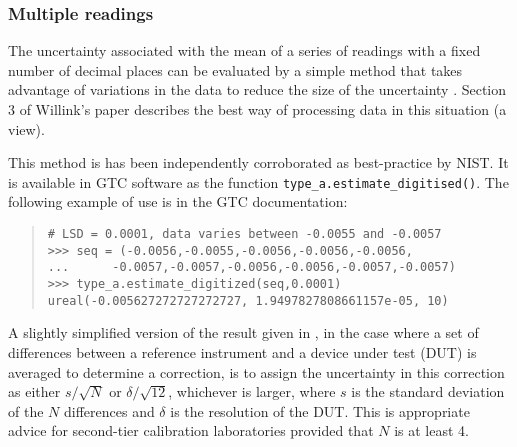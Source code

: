 \subsubsection{Multiple readings}
The uncertainty associated with the mean of a series of readings with a fixed number of decimal places can be evaluated by a simple method that takes advantage of variations in the data to reduce the size of the uncertainty \cite{WILLINK_07}. Section 3 of Willink's paper describes the best way of processing data in this situation (a view).
 
This method is has been independently corroborated as best-practice by NIST.  It is available in GTC software as the function \verb|type_a.estimate_digitised()|.   The following example of use is in the GTC documentation:
\begin{quote}
\begin{verbatim}
# LSD = 0.0001, data varies between -0.0055 and -0.0057
>>> seq = (-0.0056,-0.0055,-0.0056,-0.0056,-0.0056, 
...      -0.0057,-0.0057,-0.0056,-0.0056,-0.0057,-0.0057)
>>> type_a.estimate_digitized(seq,0.0001)
ureal(-0.005627272727272727, 1.9497827808661157e-05, 10)
\end{verbatim}
\end{quote}

A slightly simplified version of the result given in \cite{WILLINK_07}, in the case where a set of differences between a reference instrument and a device under test (DUT) is averaged to determine a correction, is to assign the uncertainty in this correction as either $s/\sqrt{N}$ or $\delta/\sqrt{12}$, whichever is larger, where $s$ is the standard deviation of the $N$ differences and $\delta$ is the resolution of the DUT. This is appropriate advice for second-tier calibration laboratories provided that $N$ is at least 4.
